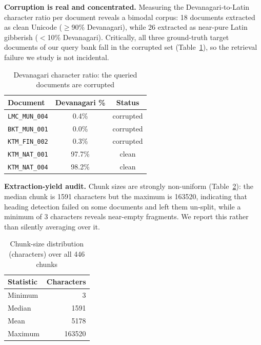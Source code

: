 \documentclass[journal]{IEEEtran}
\newcommand{\corpusChunks}{446}
\newcommand{\corpusCorruptDocs}{26}
\newcommand{\corpusCleanDocs}{18}
\newcommand{\chunkLenMedian}{1591}
\newcommand{\chunkLenMax}{163520}
\newcommand{\chunkLenMin}{3}
\begin{document}
\textbf{Corruption is real and concentrated.} Measuring the Devanagari-to-Latin character ratio per document reveals a bimodal corpus: \corpusCleanDocs{} documents extracted as clean Unicode ($\geq$90\% Devanagari), while \corpusCorruptDocs{} extracted as near-pure Latin gibberish ($<$10\% Devanagari). Critically, all three ground-truth target documents of our query bank fall in the corrupted set (Table~\ref{tab:corruption}), so the retrieval failure we study is not incidental.

\begin{table}[t]
\caption{Devanagari character ratio: the queried documents are corrupted}
\label{tab:corruption}
\centering
\begin{tabular}{lcc}
\toprule
\textbf{Document} & \textbf{Devanagari \%} & \textbf{Status} \\
\midrule
\texttt{LMC\_MUN\_004} & 0.4\% & corrupted \\
\texttt{BKT\_MUN\_001} & 0.0\% & corrupted \\
\texttt{KTM\_FIN\_002} & 0.3\% & corrupted \\
\texttt{KTM\_NAT\_001} & 97.7\% & clean \\
\texttt{KTM\_NAT\_004} & 98.2\% & clean \\
\bottomrule
\end{tabular}
\end{table}

\textbf{Extraction-yield audit.} Chunk sizes are strongly non-uniform (Table~\ref{tab:chunksize}): the median chunk is \chunkLenMedian{} characters but the maximum is \chunkLenMax{}, indicating that heading detection failed on some documents and left them un-split, while a minimum of \chunkLenMin{} characters reveals near-empty fragments. We report this rather than silently averaging over it.

\begin{table}[t]
\caption{Chunk-size distribution (characters) over all \corpusChunks{} chunks}
\label{tab:chunksize}
\centering
\begin{tabular}{lr}
\toprule
\textbf{Statistic} & \textbf{Characters} \\
\midrule
Minimum & 3 \\
Median & 1591 \\
Mean & 5178 \\
Maximum & 163520 \\
\bottomrule
\end{tabular}
\end{table}
\end{document}
